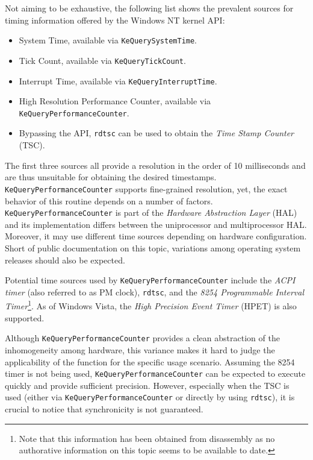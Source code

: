 Not aiming to be exhaustive, the following list shows the prevalent sources for 
timing information offered by the Windows NT kernel API:

\begin{itemize}
	\item System Time, available via \verb|KeQuerySystemTime|.
	\item Tick Count, available via \verb|KeQueryTickCount|.
	\item Interrupt Time, available via \verb|KeQueryInterruptTime|.
	\item High Resolution Performance Counter, available via \verb|KeQueryPerformanceCounter|.
	\item Bypassing the API, \verb|rdtsc| can be used to obtain the \emph{Time Stamp Counter} (TSC).
\end{itemize}

The first three sources all provide a resolution in the order of 10 milliseconds and
are thus unsuitable for obtaining the desired timestamps. \verb|KeQueryPerformanceCounter|
supports fine-grained resolution, yet, the exact behavior of this routine 
depends on a number of factors. \verb|KeQueryPerformanceCounter| is part of 
the \emph{Hardware Abstraction Layer} (HAL) and its implementation differs
between the uniprocessor and multiprocessor HAL. Moreover, it may use different 
time sources depending on hardware configuration. Short of public documentation
on this topic, variations among operating system releases should also be expected.

Potential time sources used by \verb|KeQueryPerformanceCounter| include
the \emph{ACPI timer} (also referred to as PM clock), \verb|rdtsc|, and the
\emph{8254 Programmable Interval Timer}\footnote{Note that this information has been obtained from disassembly as no
authorative information on this topic seems to be available to date.}. 
As of Windows Vista, the \emph{High Precision Event Timer} (HPET) is also supported.

Although \verb|KeQueryPerformanceCounter| provides a clean abstraction of
the inhomogeneity among hardware, this variance makes it hard to judge
the applicability of the function for the specific usage scenario. Assuming the
8254 timer is not being used, \verb|KeQueryPerformanceCounter| can be expected to
execute quickly and provide sufficient precision. However, especially when the TSC is
used (either via \verb|KeQueryPerformanceCounter| or directly by using \verb|rdtsc|),
it is crucial to notice that synchronicity is not guaranteed. 

